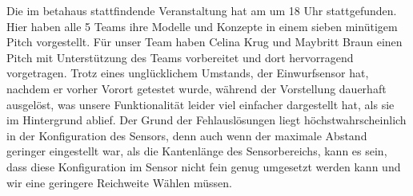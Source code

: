     Die im betahaus stattfindende Veranstaltung hat am  um 18 Uhr stattgefunden. Hier haben alle 5 Teams ihre Modelle und Konzepte in einem sieben minütigem Pitch vorgestellt. Für unser Team haben Celina Krug und Maybritt Braun einen Pitch mit Unterstützung des Teams vorbereitet und dort hervorragend vorgetragen. Trotz eines unglücklichem Umstands, der Einwurfsensor hat, nachdem er vorher Vorort getestet wurde, während der Vorstellung dauerhaft ausgelöst, was unsere Funktionalität leider viel einfacher dargestellt hat, als sie im Hintergrund ablief.
    Der Grund der Fehlauslösungen liegt höchstwahrscheinlich in der Konfiguration des Sensors, denn auch wenn der maximale Abstand geringer eingestellt war, als die Kantenlänge des Sensorbereichs, kann es sein, dass diese Konfiguration im Sensor nicht fein genug umgesetzt werden kann und wir eine geringere Reichweite Wählen müssen.
        
